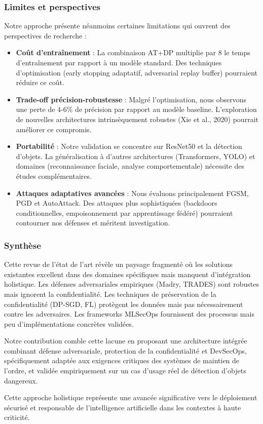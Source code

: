\subsubsection{Limites et perspectives}

Notre approche présente néanmoins certaines limitations qui ouvrent des perspectives de recherche :

\begin{itemize}
    \item \textbf{Coût d'entraînement} : La combinaison AT+DP multiplie par 8 le temps d'entraînement par rapport à un modèle standard. Des techniques d'optimisation (early stopping adaptatif, adversarial replay buffer) pourraient réduire ce coût.

    \item \textbf{Trade-off précision-robustesse} : Malgré l'optimisation, nous observons une perte de 4-6\% de précision par rapport au modèle baseline. L'exploration de nouvelles architectures intrinsèquement robustes (Xie et al., 2020) pourrait améliorer ce compromis.

    \item \textbf{Portabilité} : Notre validation se concentre sur ResNet50 et la détection d'objets. La généralisation à d'autres architectures (Transformers, YOLO) et domaines (reconnaissance faciale, analyse comportementale) nécessite des études complémentaires.

    \item \textbf{Attaques adaptatives avancées} : Nous évaluons principalement FGSM, PGD et AutoAttack. Des attaques plus sophistiquées (backdoors conditionnelles, empoisonnement par apprentissage fédéré) pourraient contourner nos défenses et méritent investigation.
\end{itemize}

\subsubsection{Synthèse}

Cette revue de l'état de l'art révèle un paysage fragmenté où les solutions existantes excellent dans des domaines spécifiques mais manquent d'intégration holistique. Les défenses adversariales empiriques (Madry, TRADES) sont robustes mais ignorent la confidentialité. Les techniques de préservation de la confidentialité (DP-SGD, FL) protègent les données mais pas nécessairement contre les adversaires. Les frameworks MLSecOps fournissent des processus mais peu d'implémentations concrètes validées.

Notre contribution comble cette lacune en proposant une architecture intégrée combinant défense adversariale, protection de la confidentialité et DevSecOps, spécifiquement adaptée aux exigences critiques des systèmes de maintien de l'ordre, et validée empiriquement sur un cas d'usage réel de détection d'objets dangereux.

Cette approche holistique représente une avancée significative vers le déploiement sécurisé et responsable de l'intelligence artificielle dans les contextes à haute criticité.